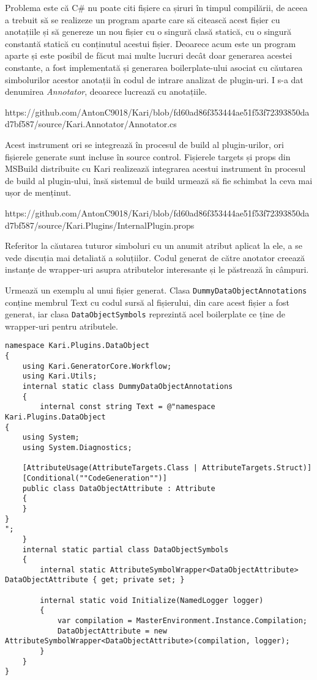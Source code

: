 \documentclass{report}
\begin{document}
Problema este că C\# nu poate citi fișiere ca șiruri în timpul compilării, de aceea a trebuit să se realizeze un program aparte care să citească acest fișier cu anotațiile și să genereze un nou fișier cu o singură clasă statică, cu o singură constantă statică cu conținutul acestui fișier.
Deoarece acum este un program aparte și este posibil de făcut mai multe lucruri decât doar generarea acestei constante, a fost implementată și generarea boilerplate-ului asociat cu căutarea simbolurilor acestor anotații în codul de intrare analizat de plugin-uri.
I s-a dat denumirea \emph{Annotator}, deoarece lucrează cu anotațiile.

https://github.com/AntonC9018/Kari/blob/fd60ad86f353444ae51f53f72393850dad7bf587/source/Kari.Annotator/Annotator.cs

Acest instrument ori se integrează în procesul de build al plugin-urilor, ori fișierele generate sunt incluse în source control.
Fișierele targets și props din MSBuild distribuite cu Kari realizează integrarea acestui instrument în procesul de build al plugin-ului,
însă sistemul de build urmează să fie schimbat la ceva mai ușor de menținut. 

https://github.com/AntonC9018/Kari/blob/fd60ad86f353444ae51f53f72393850dad7bf587/source/Kari.Plugins/InternalPlugin.props



Referitor la căutarea tuturor simboluri cu un anumit atribut aplicat la ele, a se vede discuția mai detaliată a soluțiilor.
Codul generat de către anotator creează instanțe de wrapper-uri asupra atributelor interesante și le păstrează în câmpuri.\cite{converting_attributes_roslyn}


Urmează un exemplu al unui fișier generat.
Clasa \texttt{DummyDataObjectAnnotations} conține membrul Text cu codul sursă al fișierului, din care acest fișier a fost generat,
iar clasa \texttt{DataObjectSymbols} reprezintă acel boilerplate ce ține de wrapper-uri pentru atributele.

\begin{lstlisting}
namespace Kari.Plugins.DataObject
{
    using Kari.GeneratorCore.Workflow;
    using Kari.Utils;
    internal static class DummyDataObjectAnnotations
    {
        internal const string Text = @"namespace Kari.Plugins.DataObject
{
    using System;
    using System.Diagnostics;

    [AttributeUsage(AttributeTargets.Class | AttributeTargets.Struct)]
    [Conditional(""CodeGeneration"")]
    public class DataObjectAttribute : Attribute
    {
    }
}
";
    }
    internal static partial class DataObjectSymbols
    {
        internal static AttributeSymbolWrapper<DataObjectAttribute> DataObjectAttribute { get; private set; }

        internal static void Initialize(NamedLogger logger)
        {
            var compilation = MasterEnvironment.Instance.Compilation;
            DataObjectAttribute = new AttributeSymbolWrapper<DataObjectAttribute>(compilation, logger);
        }
    }
}
\end{lstlisting}
\end{document}
